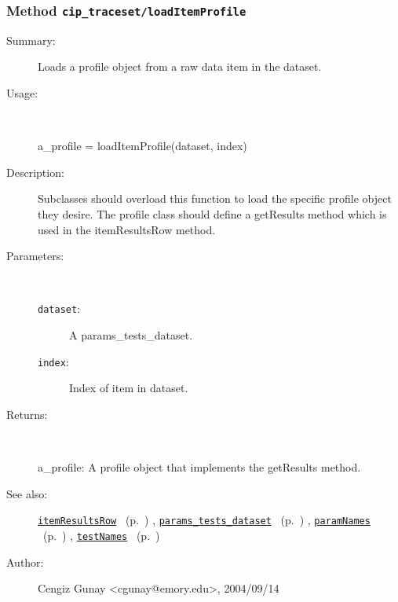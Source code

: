 \subsubsection[Method \texttt{loadItemProfile}]{Method \texttt{cip\_traceset/loadItemProfile}}%
%
\label{ref_cip_traceset__loadItemProfile}%
\hypertarget{ref_cip_traceset__loadItemProfile}{}%
\begin{description}
\item[Summary:]Loads a profile object from a raw data item in the dataset.
%
\item[Usage:]~%
\begin{lyxcode}%
a\_profile = loadItemProfile(dataset, index)
%
\end{lyxcode}%
%
\item[Description:]%
Subclasses should overload this function to load the specific profile
 object they desire. The profile class should define a getResults method
 which is used in the itemResultsRow method.
\item[Parameters:]~
\begin{description}%
\item[\texttt{dataset}:]
 A params\_tests\_dataset.
\item[\texttt{index}:]
 Index of item in dataset.
\end{description}%
%
\item[Returns:
]~

	a\_profile: A profile object that implements the getResults method.
%
%
\item[See also:]%
\hyperlink{ref_itemResultsRow}{\texttt{itemResultsRow}}%
\ (p.~\pageref{ref_itemResultsRow})%
%
, \hyperlink{ref_params_tests_dataset}{\texttt{params\_tests\_dataset}}%
\ (p.~\pageref{ref_params_tests_dataset})%
%
, \hyperlink{ref_paramNames}{\texttt{paramNames}}%
\ (p.~\pageref{ref_paramNames})%
%
, \hyperlink{ref_testNames}{\texttt{testNames}}%
\ (p.~\pageref{ref_testNames})%
%
%
\item[Author:]%
Cengiz Gunay <cgunay@emory.edu>, 2004/09/14
%
\end{description}
\methodline%
